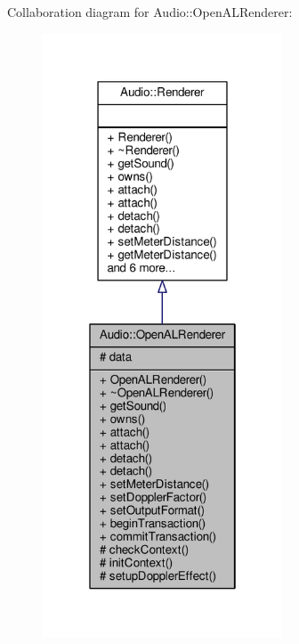 Collaboration diagram for Audio\+:\+:Open\+A\+L\+Renderer\+:
\nopagebreak
\begin{figure}[H]
\begin{center}
\leavevmode
\includegraphics[width=202pt]{dd/d80/classAudio_1_1OpenALRenderer__coll__graph}
\end{center}
\end{figure}
